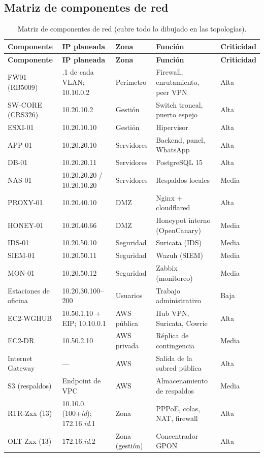 \subsection{Matriz de componentes de red}

{\small
\begin{longtable}{L{2.7cm}L{3.2cm}L{2.2cm}L{3.9cm}L{1.4cm}}
\caption{Matriz de componentes de red (cubre todo lo dibujado en las topologías).}\label{tab:ce03-componentes-red}\\
\toprule
\textbf{Componente} & \textbf{IP planeada} & \textbf{Zona} & \textbf{Función} & \textbf{Criticidad} \\
\midrule
\endfirsthead
\toprule
\textbf{Componente} & \textbf{IP planeada} & \textbf{Zona} & \textbf{Función} & \textbf{Criticidad} \\
\midrule
\endhead
\bottomrule
\endlastfoot
FW01 (RB5009) & .1 de cada VLAN; 10.10.0.2 & Perímetro & Firewall, enrutamiento, peer VPN & Alta \\
SW-CORE (CRS326) & 10.20.10.2 & Gestión & Switch troncal, puerto espejo & Alta \\
ESXI-01 & 10.20.10.10 & Gestión & Hipervisor & Alta \\
APP-01 & 10.20.20.10 & Servidores & Backend, panel, WhatsApp & Alta \\
DB-01 & 10.20.20.11 & Servidores & PostgreSQL 15 & Alta \\
NAS-01 & 10.20.20.20 / 10.20.10.20 & Servidores & Respaldos locales & Media \\
PROXY-01 & 10.20.40.10 & DMZ & Nginx + cloudflared & Alta \\
HONEY-01 & 10.20.40.66 & DMZ & Honeypot interno (OpenCanary) & Media \\
IDS-01 & 10.20.50.10 & Seguridad & Suricata (IDS) & Media \\
SIEM-01 & 10.20.50.11 & Seguridad & Wazuh (SIEM) & Media \\
MON-01 & 10.20.50.12 & Seguridad & Zabbix (monitoreo) & Media \\
Estaciones de oficina & 10.20.30.100--200 & Usuarios & Trabajo administrativo & Baja \\
EC2-WGHUB & 10.50.1.10 + EIP; 10.10.0.1 & AWS pública & Hub VPN, Suricata, Cowrie & Alta \\
EC2-DR & 10.50.2.10 & AWS privada & Réplica de contingencia & Media \\
Internet Gateway & --- & AWS & Salida de la subred pública & Alta \\
S3 (respaldos) & Endpoint de VPC & AWS & Almacenamiento de respaldos & Media \\
RTR-Zxx (13) & 10.10.0.(100+\textit{id}); 172.16.\textit{id}.1 & Zona & PPPoE, colas, NAT, firewall & Alta \\
OLT-Zxx (13) & 172.16.\textit{id}.2 & Zona (gestión) & Concentrador GPON & Alta \\
\end{longtable}
}

